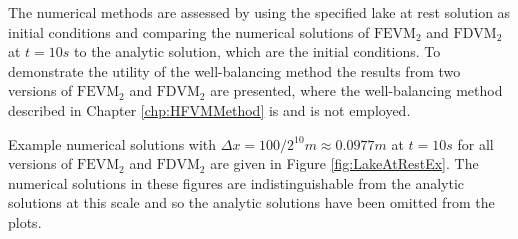 \documentclass[times]{elsarticle}
\begin{document}
The numerical methods are assessed by using the specified lake at rest solution as initial conditions and comparing the numerical solutions of $\text{FEVM}_2$ and $\text{FDVM}_2$ at $t=10s$ to the analytic solution, which are the initial conditions. To demonstrate the utility of the well-balancing method the results from two versions of $\text{FEVM}_2$ and $\text{FDVM}_2$ are presented, where the well-balancing method described in Chapter \ref{chp:HFVMMethod} is and is not employed. 

Example numerical solutions with $\Delta x = 100/2^{10}m \approx 0.0977m$ at $t=10s$ for all versions of $\text{FEVM}_2$ and $\text{FDVM}_2$ are given in Figure \ref{fig:LakeAtRestEx}. The numerical solutions in these figures are indistinguishable from the analytic solutions at this scale and so the analytic solutions have been omitted from the plots. 
\end{document}

